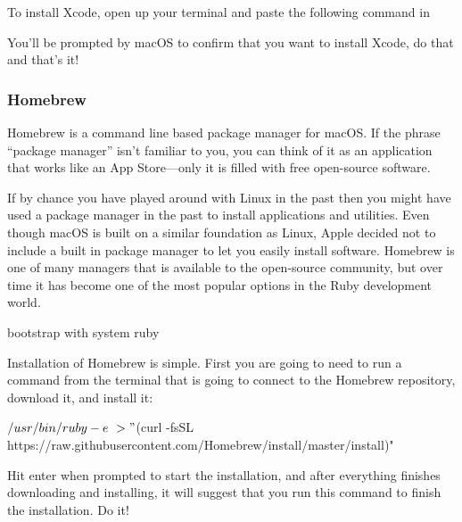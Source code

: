 To install Xcode, open up your terminal and paste the following command in

\begin{codelisting}
\label{code:xcode-install}
\end{codelisting}

You'll be prompted by macOS to confirm that you want to install Xcode, do that and that's it!


\subsubsection{Homebrew}
\label{sec:homebrew}

Homebrew is a command line based package manager for macOS\@. If the phrase ``package manager'' isn't familiar to you, you can think of it as an application that works like an App Store---only it is filled with free open-source software.

If by chance you have played around with Linux in the past then you might have used a package manager in the past to install applications and utilities. Even though macOS is built on a similar foundation as Linux, Apple decided not to include a built in package manager to let you easily install software. Homebrew is one of many managers that is available to the open-source community, but over time it has become one of the most popular options in the Ruby development world.

bootstrap with system ruby

Installation of Homebrew is simple. First you are going to need to run a command from the terminal that is going to connect to the Homebrew repository, download it, and install it:

\begin{codelisting}
\label{code:homebrew-install}
\begin{code}
$ /usr/bin/ruby -e \
> "$(curl -fsSL https://raw.githubusercontent.com/Homebrew/install/master/install)"
\end{code}
\end{codelisting}

Hit enter when prompted to start the installation, and after everything finishes downloading and installing, it will suggest that you run this command to finish the installation. Do it!

